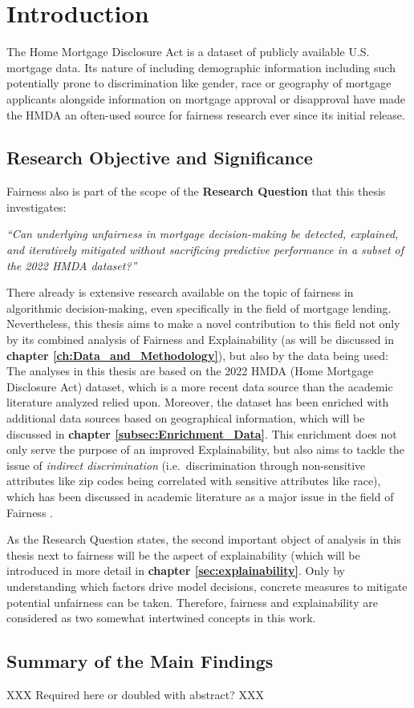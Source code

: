 \chapter{Introduction}\label{ch:Introduction}

The Home Mortgage Disclosure Act \parencite{HMDA2022} is a dataset of publicly available U.S. mortgage data. Its nature of including demographic information including such potentially prone to discrimination like gender, race or geography of mortgage applicants alongside information on mortgage approval or disapproval have made the HMDA an often-used source for fairness research ever since its initial release.

\section{Research Objective and Significance}\label{sec:Research_Objective_and_Significance}

Fairness also is part of the scope of the \textbf{Research Question} that this thesis investigates:

\textit{“Can underlying unfairness in mortgage decision-making be detected, explained, and iteratively mitigated without sacrificing predictive performance in a subset of the 2022 HMDA dataset?”}

There already is extensive research available on the topic of fairness in algorithmic decision-making, even specifically in the field of mortgage lending.
Nevertheless, this thesis aims to make a novel contribution to this field not only by its combined analysis of Fairness and Explainability (as will be discussed in \textbf{chapter \ref{ch:Data_and_Methodology}}),
but also by the data being used: The analyses in this thesis are based on the 2022 HMDA (Home Mortgage Disclosure Act) dataset, which is a more recent data source than the academic literature analyzed relied upon.
Moreover, the dataset has been enriched with additional data sources based on geographical information, which will be discussed in \textbf{chapter \ref{subsec:Enrichment_Data}}.
This enrichment does not only serve the purpose of an improved Explainability, but also aims to tackle the issue of \textit{indirect discrimination} (i.e.\ discrimination through non-sensitive attributes like zip codes being correlated with sensitive attributes like race), 
which has been discussed in academic literature as a major issue in the field of Fairness \parencite{Mehrabi2021}.

As the Research Question states, the second important object of analysis in this thesis next to fairness will be the aspect of explainability (which will be introduced in more detail in \textbf{chapter \ref{sec:explainability}}. Only by understanding which factors drive model decisions, concrete measures to mitigate potential unfairness can be taken. Therefore, fairness and explainability are considered as two somewhat intertwined concepts in this work.

\section{Summary of the Main Findings}\label{sec:Summary_of_the_Main_Findings}

XXX Required here or doubled with abstract? XXX